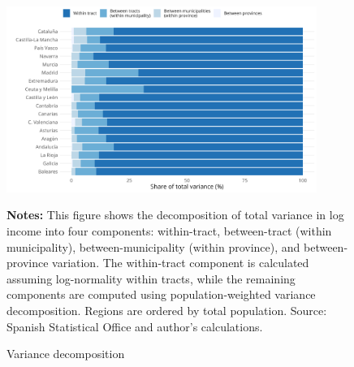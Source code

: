 \begin{figure}[H]
\begin{center}
\captionsetup{justification=centering}
\caption{Variance decomposition}
\label{fig:variance_decomp}
\includegraphics[width=0.9\textwidth]{output/variance_decomp.png}
\end{center}
\begin{fignotes2}
\textbf{Notes:} This figure shows the decomposition of total variance in log income into four components: within-tract, between-tract (within municipality), between-municipality (within province), and between-province variation. The within-tract component is calculated assuming log-normality within tracts, while the remaining components are computed using population-weighted variance decomposition. Regions are ordered by total population. Source: Spanish Statistical Office and author's calculations.
\end{fignotes2}
\end{figure}